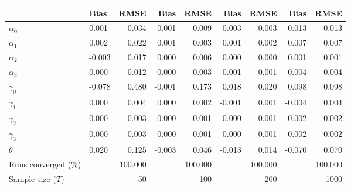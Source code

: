 
\begin{tabular}[t]{llrrrrrrr}
\toprule
  & Bias & RMSE & Bias & RMSE & Bias & RMSE & Bias & RMSE\\
\midrule
$\alpha_{0}$ & 0.001 & 0.034 & 0.001 & 0.009 & 0.003 & 0.003 & 0.013 & 0.013\\
$\alpha_{1}$ & 0.002 & 0.022 & 0.001 & 0.003 & 0.001 & 0.002 & 0.007 & 0.007\\
$\alpha_{2}$ & -0.003 & 0.017 & 0.000 & 0.006 & 0.000 & 0.000 & 0.001 & 0.001\\
$\alpha_{3}$ & 0.000 & 0.012 & 0.000 & 0.003 & 0.001 & 0.001 & 0.004 & 0.004\\
$\gamma_{0}$ & -0.078 & 0.480 & -0.001 & 0.173 & 0.018 & 0.020 & 0.098 & 0.098\\
$\gamma_{1}$ & 0.000 & 0.004 & 0.000 & 0.002 & -0.001 & 0.001 & -0.004 & 0.004\\
$\gamma_{2}$ & 0.000 & 0.003 & 0.000 & 0.001 & 0.000 & 0.001 & -0.002 & 0.002\\
$\gamma_{3}$ & 0.000 & 0.003 & 0.000 & 0.001 & 0.000 & 0.001 & -0.002 & 0.002\\
$\theta$ & 0.020 & 0.125 & -0.003 & 0.046 & -0.013 & 0.014 & -0.070 & 0.070\\
Runs converged (\%) &  & 100.000 &  & 100.000 &  & 100.000 &  & 100.000\\
Sample size ($T$) &  & 50 &  & 100 &  & 200 &  & 1000\\
\bottomrule
\end{tabular}
